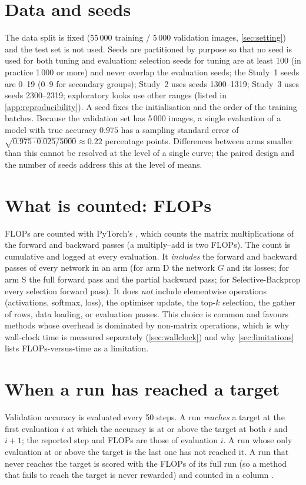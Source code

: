 \section{Data and seeds}
The data split is fixed (55\,000 training / 5\,000 validation images, \cref{sec:setting}) and the test set is not used. Seeds are partitioned by purpose so that no seed is used for both tuning and evaluation: selection seeds for tuning are at least 100 (in practice 1\,000 or more) and never overlap the evaluation seeds; the Study~1 seeds are 0--19 (0--9 for secondary groups); Study~2 uses seeds 1300--1319; Study~3 uses seeds 2300--2319; exploratory looks use other ranges (listed in \cref{app:reproducibility}). A seed fixes the initialisation and the order of the training batches. Because the validation set has 5\,000 images, a single evaluation of a model with true accuracy $0.975$ has a sampling standard error of $\sqrt{0.975\cdot0.025/5000}\approx0.22$ percentage points. Differences between arms smaller than this cannot be resolved at the level of a single curve; the paired design and the number of seeds address this at the level of means.

\section{What is counted: FLOPs}\label{sec:flops}
FLOPs are counted with PyTorch's , which counts the matrix multiplications of the forward and backward passes (a multiply--add is two FLOPs). The count is cumulative and logged at every evaluation. It \emph{includes} the forward and backward passes of every network in an arm (for arm D the network $G$ and its losses; for arm S the full forward pass and the partial backward pass; for Selective-Backprop every selection forward pass). It does \emph{not} include elementwise operations (activations, softmax, loss), the optimiser update, the top-$k$ selection, the gather of rows, data loading, or evaluation passes. This choice is common and favours methods whose overhead is dominated by non-matrix operations, which is why wall-clock time is measured separately (\cref{sec:wallclock}) and why \cref{sec:limitations} lists FLOPs-versus-time as a limitation.

\section{When a run has reached a target}\label{sec:crossing}
Validation accuracy is evaluated every 50 steps. A run \emph{reaches} a target at the first evaluation $i$ at which the accuracy is at or above the target at both $i$ and $i+1$; the reported step and FLOPs are those of evaluation $i$. A run whose only evaluation at or above the target is the last one has not reached it. A run that never reaches the target is scored with the FLOPs of its full run (so a method that fails to reach the target is never rewarded) and counted in a column .

